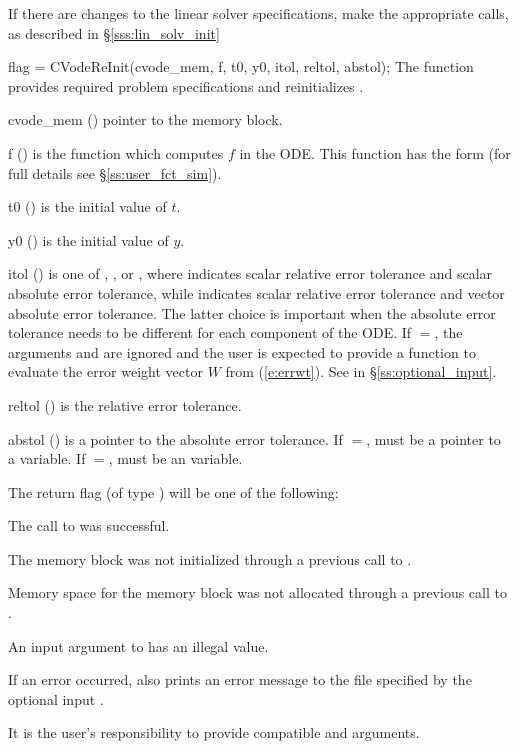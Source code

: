 If there are changes to the linear solver specifications, make the
appropriate  calls, as described in \S\ref{sss:lin_solv_init}

{
  flag = CVodeReInit(cvode\_mem, f, t0, y0, itol, reltol, abstol);
}
{
  The function  provides required problem specifications 
  and reinitializes {\cvodes}.
}
{
  \begin{args}
  \item[cvode\_mem] ()
    pointer to the {\cvodes} memory block.
  \item[f] ()
    is the {\C} function which computes $f$ in the ODE. This function has the form 
     (for full details see \S\ref{ss:user_fct_sim}).
  \item[t0] ()
    is the initial value of $t$.
  \item[y0] ()
    is the initial value of $y$. 
  \item[itol] () 
    is one of , , or , where  indicates scalar
    relative error tolerance and scalar absolute error tolerance, while
     indicates scalar relative error tolerance and vector
    absolute error tolerance.  The latter choice is important when the absolute
    error tolerance needs to be different for each component of the ODE. 
    If $=$, the arguments  and  are ignored
    and the user is expected to provide a function to evaluate the error weight vector
    $W$ from (\ref{e:errwt}). See  in \S\ref{ss:optional_input}.
  \item[reltol] ()
    is the relative error tolerance.
  \item[abstol] ()
    is a pointer to the absolute error tolerance.  If $=$, 
    must be a pointer to a  variable. If $=$, 
    must be an  variable.
  \end{args}
}
{
  The return flag  (of type ) will be one of the following:
  \begin{args}[CV\_NO\_MALLOC]
  \item[\Id{CV\_SUCCESS}]
    The call to  was successful.
  \item[\Id{CV\_MEM\_NULL}] 
    The {\cvodes} memory block was not initialized through a 
    previous call to .
  \item[\Id{CV\_NO\_MALLOC}] 
    Memory space for the {\cvodes} memory block was not allocated through a 
    previous call to .
  \item[\Id{CV\_ILL\_INPUT}] 
    An input argument to  has an illegal value.
  \end{args}
}
{
  If an error occurred,  also prints an error message to the
  file specified by the optional input .

  {\warn} It is the user's responsibility to provide compatible  and
   arguments.
}

